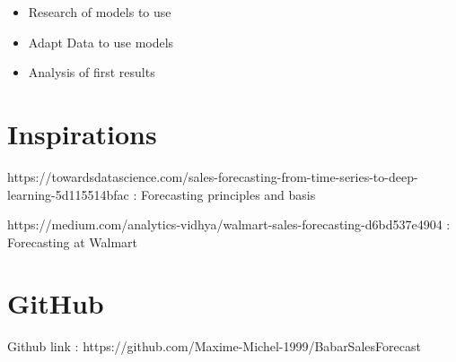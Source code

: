 \documentclass{report}
\begin{document}
\begin{itemize}
\item Research of models to use 
\item Adapt Data to use models
\item Analysis of first results
\end{itemize}


\section{Inspirations}

https://towardsdatascience.com/sales-forecasting-from-time-series-to-deep-learning-5d115514bfac : Forecasting principles and basis 

https://medium.com/analytics-vidhya/walmart-sales-forecasting-d6bd537e4904 : Forecasting at Walmart 

\section{GitHub}

Github link : https://github.com/Maxime-Michel-1999/BabarSalesForecast
\end{document}
